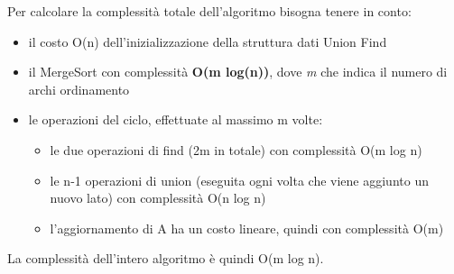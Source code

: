 		Per calcolare la complessità totale dell'algoritmo bisogna tenere in conto:
		\begin{itemize}
			\item il costo O(n) dell'inizializzazione della struttura dati Union Find
			\item il MergeSort con complessità \textbf{O(m log(n))}, dove \emph{m} che indica il numero di archi ordinamento
			\item le operazioni del ciclo, effettuate al massimo m volte:
			\begin{itemize}
				\item le due operazioni di find (2m in totale) con complessità O(m log n)
				\item le n-1 operazioni di union (eseguita ogni volta che viene aggiunto un nuovo lato) con complessità O(n log n)
				\item l'aggiornamento di A ha un costo lineare, quindi con complessità O(m)
			\end{itemize}
		\end{itemize}
		La complessità dell'intero algoritmo è quindi O(m log n).

\pagebreak